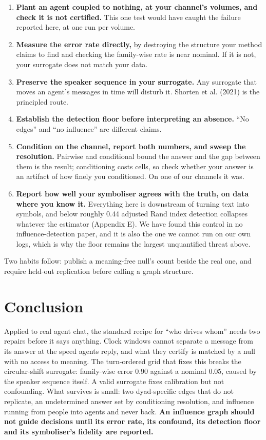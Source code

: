 \documentclass[11pt]{article}
\begin{document}
\begin{enumerate}
\item \textbf{Plant an agent coupled to nothing, at your channel's volumes, and check it is not certified.} This one test would have caught the failure reported here, at one run per volume.
\item \textbf{Measure the error rate directly,} by destroying the structure your method claims to find and checking the family-wise rate is near nominal. If it is not, your surrogate does not match your data.
\item \textbf{Preserve the speaker sequence in your surrogate.} Any surrogate that moves an agent's messages in time will disturb it. Shorten et al. (2021) is the principled route.
\item \textbf{Establish the detection floor before interpreting an absence.} ``No edges'' and ``no influence'' are different claims.
\item \textbf{Condition on the channel, report both numbers, and sweep the resolution.} Pairwise and conditional bound the answer and the gap between them is the result; conditioning costs cells, so check whether your answer is an artifact of how finely you conditioned. On one of our channels it was.
\item \textbf{Report how well your symboliser agrees with the truth, on data where you know it.} Everything here is downstream of turning text into symbols, and below roughly 0.44 adjusted Rand index detection collapses whatever the estimator (Appendix E). We have found this control in no influence-detection paper, and it is also the one we cannot run on our own logs, which is why the floor remains the largest unquantified threat above.
\end{enumerate}

Two habits follow: publish a meaning-free null's count beside the real one, and require held-out replication before calling a graph structure.

\section{Conclusion}

Applied to real agent chat, the standard recipe for ``who drives whom'' needs two repairs before it says anything. Clock windows cannot separate a message from its answer at the speed agents reply, and what they certify is matched by a null with no access to meaning. The turn-ordered grid that fixes this breaks the circular-shift surrogate: family-wise error 0.90 against a nominal 0.05, caused by the speaker sequence itself. A valid surrogate fixes calibration but not confounding. What survives is small: two dyad-specific edges that do not replicate, an undetermined answer set by conditioning resolution, and influence running from people into agents and never back. \textbf{An influence graph should not guide decisions until its error rate, its confound, its detection floor and its symboliser's fidelity are reported.}
\end{document}
